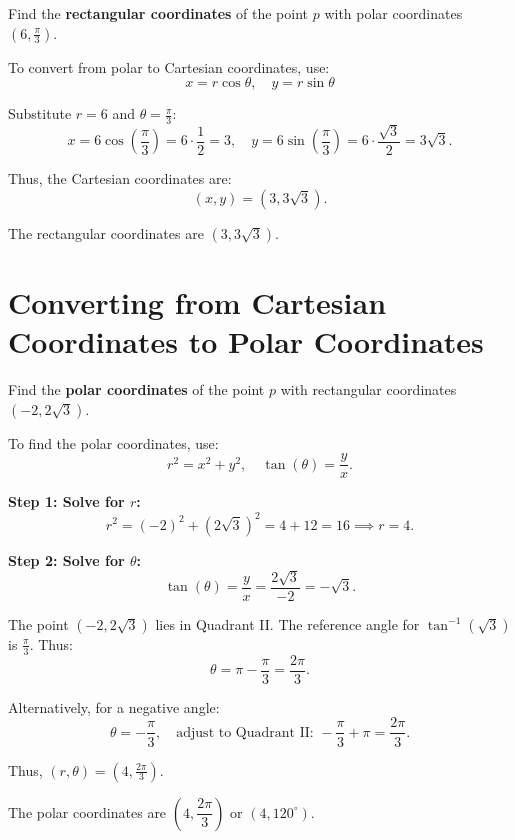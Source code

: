 \documentclass{article}
\begin{document}
\begin{examplebox}
Find the \textbf{rectangular coordinates} of the point \( p \) with polar coordinates \( (6, \frac{\pi}{3}) \).

\begin{solutionbox}
To convert from polar to Cartesian coordinates, use:
\[
    x = r \cos \theta, \quad y = r \sin \theta
\]

Substitute \( r = 6 \) and \( \theta = \frac{\pi}{3} \):
\[
    x = 6 \cos\left(\frac{\pi}{3}\right) = 6 \cdot \frac{1}{2} = 3, \quad
    y = 6 \sin\left(\frac{\pi}{3}\right) = 6 \cdot \frac{\sqrt{3}}{2} = 3\sqrt{3}.
\]

Thus, the Cartesian coordinates are:
\[
    (x, y) = (3, 3\sqrt{3}).
\]

\begin{answerbox}
The rectangular coordinates are \( (3, 3\sqrt{3}) \).
\end{answerbox}
\end{solutionbox}
\end{examplebox}

\section*{Converting from Cartesian Coordinates to Polar Coordinates}
\begin{examplebox}
Find the \textbf{polar coordinates} of the point \( p \) with rectangular coordinates \( (-2, 2\sqrt{3}) \).

\begin{solutionbox}
To find the polar coordinates, use:
\[
    r^2 = x^2 + y^2, \quad \tan(\theta) = \frac{y}{x}.
\]

\textbf{Step 1: Solve for \( r \):}
\[
    r^2 = (-2)^2 + (2\sqrt{3})^2 = 4 + 12 = 16 \implies r = 4.
\]

\textbf{Step 2: Solve for \( \theta \):}
\[
    \tan(\theta) = \frac{y}{x} = \frac{2\sqrt{3}}{-2} = -\sqrt{3}.
\]

The point \( (-2, 2\sqrt{3}) \) lies in Quadrant II. The reference angle for \( \tan^{-1}(\sqrt{3}) \) is \( \frac{\pi}{3} \). Thus:
\[
    \theta = \pi - \frac{\pi}{3} = \frac{2\pi}{3}.
\]

\begin{tipbox}
    Alternatively, for a negative angle:
    \[
        \theta = -\frac{\pi}{3}, \quad \text{adjust to Quadrant II: } -\frac{\pi}{3} + \pi = \frac{2\pi}{3}.
    \]
\end{tipbox}

Thus, \( (r, \theta) = (4, \frac{2\pi}{3}) \).

\begin{answerbox}
The polar coordinates are \( (4, \dfrac{2\pi}{3}) \) or \( (4, 120^\circ) \).
\end{answerbox}
\end{solutionbox}
\end{examplebox}
\end{document}
